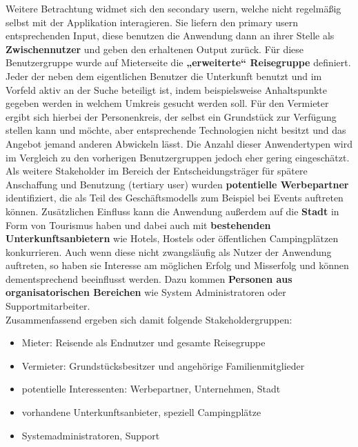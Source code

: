 Weitere Betrachtung widmet sich den secondary usern, welche nicht regelmäßig selbst mit der Applikation interagieren. Sie liefern den primary usern entsprechenden Input, diese benutzen die Anwendung dann an ihrer Stelle als \textbf{Zwischennutzer} und geben den erhaltenen Output zurück. Für diese Benutzergruppe wurde auf Mieterseite die \textbf{„erweiterte“ Reisegruppe} definiert. Jeder der neben dem eigentlichen Benutzer die Unterkunft benutzt und im Vorfeld aktiv an der Suche beteiligt ist, indem beispielsweise Anhaltspunkte gegeben werden in welchem Umkreis gesucht werden soll.
Für den Vermieter ergibt sich hierbei der Personenkreis, der selbst ein Grundstück zur Verfügung stellen kann und möchte, aber entsprechende Technologien nicht besitzt und das Angebot jemand anderen Abwickeln lässt. Die Anzahl dieser Anwendertypen wird im Vergleich zu den vorherigen Benutzergruppen jedoch eher gering eingeschätzt.\\
 
Als weitere Stakeholder im Bereich der Entscheidungsträger für spätere Anschaffung und Benutzung (tertiary user) wurden \textbf{potentielle Werbepartner} identifiziert, die als Teil des Geschäftsmodells zum Beispiel bei Events auftreten können. Zusätzlichen Einfluss kann die Anwendung außerdem auf die \textbf{Stadt} in Form von Tourismus haben und dabei auch mit \textbf{bestehenden Unterkunftsanbietern} wie Hotels, Hostels oder öffentlichen Campingplätzen konkurrieren. Auch wenn diese nicht zwangsläufig als Nutzer der Anwendung auftreten, so haben sie Interesse am möglichen Erfolg und Misserfolg und können dementsprechend beeinflusst werden.
Dazu kommen \textbf{Personen aus organisatorischen Bereichen} wie System Administratoren oder Supportmitarbeiter.\\
 
 Zusammenfassend ergeben sich damit folgende Stakeholdergruppen:
 \begin{itemize}
   \item
   Mieter: Reisende als Endnutzer und gesamte Reisegruppe

   \item 
   Vermieter: Grundstücksbesitzer und angehörige Familienmitglieder

   \item
   potentielle Interessenten: Werbepartner, Unternehmen, Stadt

   \item 
   vorhandene Unterkunftsanbieter, speziell Campingplätze

   \item
   Systemadministratoren, Support\\
\end{itemize} 


